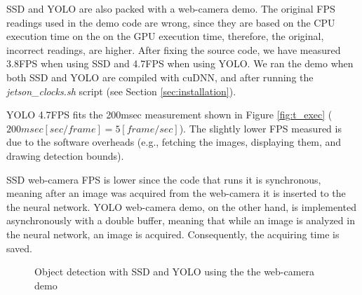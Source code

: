 SSD and YOLO are also packed with a web-camera demo. The original FPS readings used in the demo code are wrong, since they are based on the CPU execution time on the on the GPU execution time, therefore, the original, incorrect readings, are higher. After fixing the source code, we have measured 3.8FPS when using SSD and 4.7FPS when using YOLO. We ran the demo when both SSD and YOLO are compiled with cuDNN, and after running the \textit{jetson\_clocks.sh} script (see Section \ref{sec:installation}).

YOLO 4.7FPS fits the 200msec measurement shown in Figure \ref{fig:t_exec} ($200msec [sec/frame] = 5[frame/sec]$). The slightly lower FPS measured is due to the software overheads (e.g., fetching the images, displaying them, and drawing detection bounds).

SSD web-camera FPS is lower since the code that runs it is synchronous, meaning after an image was acquired from the web-camera it is inserted to the the neural network. YOLO web-camera demo, on the other hand, is implemented asynchronously with a double buffer, meaning that while an image is analyzed in the neural network, an image is acquired. Consequently, the acquiring time is saved. 

\begin{figure}[h]
	\caption{Object detection with SSD and YOLO using the the web-camera demo}
	\label{fig:cam}
\end{figure}